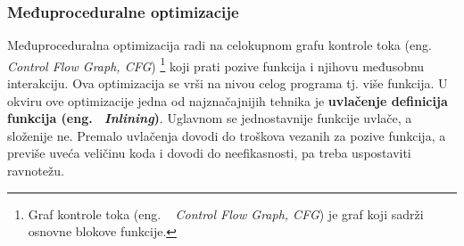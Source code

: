 \documentclass[a4paper]{article}
\begin{document}
\subsubsection{Međuproceduralne optimizacije}
\label{subsubsec:međuproceduralne} 
Međuproceduralna optimizacija radi na celokupnom grafu kontrole toka (eng. ~ {\em Control Flow Graph, CFG}) \footnote{Graf kontrole toka (eng. ~ {\em Control Flow Graph, CFG}) je graf koji sadrži osnovne blokove funkcije.} koji prati pozive funkcija i njihovu međusobnu interakciju. \cite{kkMVJ}
Ova optimizacija se vrši na nivou celog programa tj. više funkcija. U okviru ove optimizacije jedna od najznačajnijih tehnika je \textbf{uvlačenje definicija funkcija (eng. ~{\em Inlining})}. 
Uglavnom se jednostavnije funkcije uvlače, a složenije ne. 
Premalo uvlačenja dovodi do troškova vezanih za pozive funkcija, a previše uveća veličinu koda i dovodi do neefikasnosti, pa treba uspostaviti ravnotežu. \cite{kkFM}
\end{document}
